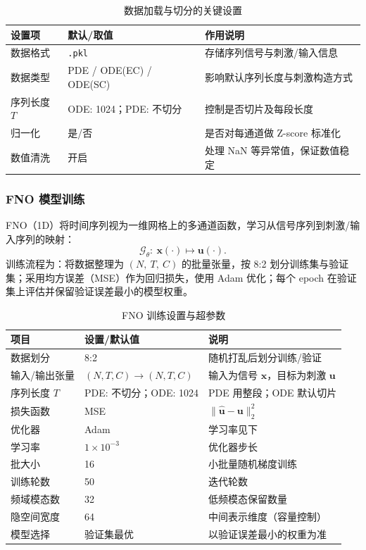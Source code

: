 \documentclass[12pt,a4paper]{article}
\begin{document}
\begin{table}[h]
\centering
\caption{数据加载与切分的关键设置}
\begin{tabular}{@{}lll@{}}
\toprule
设置项 & 默认/取值 & 作用说明 \\ \midrule
数据格式 & \texttt{.pkl} & 存储序列信号与刺激/输入信息 \\
数据类型 & PDE / ODE(EC) / ODE(SC) & 影响默认序列长度与刺激构造方式 \\
序列长度 $T$ & ODE: 1024；PDE: 不切分 & 控制是否切片及每段长度 \\
归一化 & 是/否 & 是否对每通道做 Z-score 标准化 \\
数值清洗 & 开启 & 处理 NaN 等异常值，保证数值稳定 \\
\bottomrule
\end{tabular}
\end{table}

\subsubsection{FNO 模型训练}

FNO（1D）将时间序列视为一维网格上的多通道函数，学习从信号序列到刺激/输入序列的映射：
\[
\mathcal{G}_{\theta}:\ \mathbf{x}(\cdot) \mapsto \mathbf{u}(\cdot).
\]
训练流程为：将数据整理为 $(N,\ T,\ C)$ 的批量张量，按 8:2 划分训练集与验证集；采用均方误差（MSE）作为回归损失，使用 Adam 优化；每个 epoch 在验证集上评估并保留验证误差最小的模型权重。

\begin{table}[h]
\centering
\caption{FNO 训练设置与超参数}
\begin{tabular}{@{}lll@{}}
\toprule
项目 & 设置/默认值 & 说明 \\ \midrule
数据划分 & 8:2 & 随机打乱后划分训练/验证 \\
输入/输出张量 & $(N,T,C)\rightarrow(N,T,C)$ & 输入为信号 $\mathbf{x}$，目标为刺激 $\mathbf{u}$ \\
序列长度 $T$ & PDE: 不切分；ODE: 1024 & PDE 用整段；ODE 默认切片 \\
损失函数 & MSE & $\|\hat{\mathbf{u}}-\mathbf{u}\|_2^2$ \\
优化器 & Adam & 学习率见下 \\
学习率 & $1\times10^{-3}$ & 优化器步长 \\
批大小 & 16 & 小批量随机梯度训练 \\
训练轮数 & 50 & 迭代轮数 \\
频域模态数 & 32 & 低频模态保留数量 \\
隐空间宽度 & 64 & 中间表示维度（容量控制） \\
模型选择 & 验证集最优 & 以验证误差最小的权重为准 \\
\bottomrule
\end{tabular}
\end{table}
\end{document}
